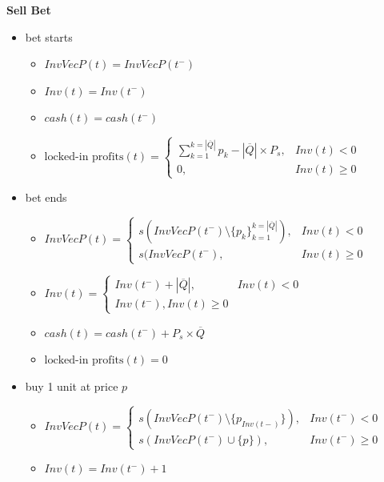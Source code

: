 \documentclass{article}
\begin{document}
\textbf{Sell Bet} \\

\begin{itemize}
    \item bet starts
    \begin{itemize}
        \item $InvVecP(t) = InvVecP(t^-)$
        \item $Inv(t) = Inv(t^-)$
        \item $cash(t) = cash(t^-)$
        \item $\text{locked-in profits}(t) = 
        \begin{cases} 
            \sum^{k = |\overline{Q}|}_{k = 1} p_k - |\overline{Q}| \times P_s, & Inv(t) < 0 \\
            0, & Inv(t) \geq 0 
        \end{cases}$
    \end{itemize}
    \item bet ends
    \begin{itemize}
        \item $InvVecP(t) = 
        \begin{cases}
            s(InvVecP(t^-) \setminus \{p_k\}_{k = 1}^{k = |\overline{Q}|}), & Inv(t) < 0 \\
            s(InvVecP(t^-), & Inv(t) \geq 0
        \end{cases}$
        \item $Inv(t) = 
        \begin{cases}
            Inv(t^-) + |\overline{Q}|, & Inv(t) < 0 \\
            Inv(t^-), Inv(t) \geq 0
        \end{cases}$
        \item $cash(t) = cash(t^-) + P_s \times \overline{Q}$
        \item $\text{locked-in profits}(t) = 0$
    \end{itemize}
    \item buy 1 unit at price $p$ %
    \begin{itemize}
        \item $InvVecP(t) =
            \begin{cases}
                s(InvVecP(t^-) \setminus \{p_{Inv(t-)}\}), & Inv(t^-) < 0 \\
                s(InvVecP(t^-) \cup \{p\}), & Inv(t^-) \geq 0
            \end{cases}$
        \item $Inv(t)= Inv(t^-) + 1$

\end{itemize}
\end{itemize}
\end{document}

